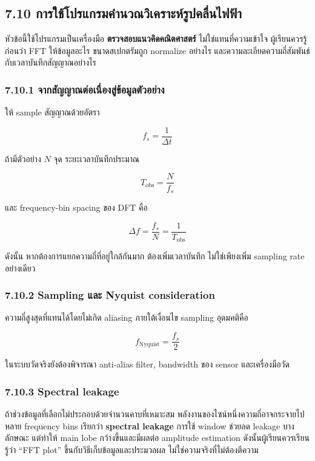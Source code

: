 \subsection{7.10 การใช้โปรแกรมคำนวณวิเคราะห์รูปคลื่นไฟฟ้า}

หัวข้อนี้ใช้โปรแกรมเป็นเครื่องมือ \textbf{ตรวจสอบแนวคิดคณิตศาสตร์} ไม่ใช่แทนที่ความเข้าใจ ผู้เรียนควรรู้ก่อนว่า FFT ให้ข้อมูลอะไร ขนาดสเปกตรัมถูก normalize อย่างไร และความละเอียดความถี่สัมพันธ์กับเวลาบันทึกสัญญาณอย่างไร

\subsubsection{7.10.1 จากสัญญาณต่อเนื่องสู่ข้อมูลตัวอย่าง}

ให้ sample สัญญาณด้วยอัตรา

\[
f_s=\frac{1}{\Delta t}
\]

ถ้ามีตัวอย่าง $N$ จุด ระยะเวลาบันทึกประมาณ

\[
T_{\mathrm{obs}}=\frac{N}{f_s}
\]

และ frequency-bin spacing ของ DFT คือ

\[
\Delta f=\frac{f_s}{N}=\frac{1}{T_{\mathrm{obs}}}
\]

ดังนั้น หากต้องการแยกความถี่ที่อยู่ใกล้กันมาก ต้องเพิ่มเวลาบันทึก ไม่ใช่เพียงเพิ่ม sampling rate อย่างเดียว

\subsubsection{7.10.2 Sampling และ Nyquist consideration}

ความถี่สูงสุดที่แทนได้โดยไม่เกิด aliasing ภายใต้เงื่อนไข sampling อุดมคติคือ

\[
f_{\mathrm{Nyquist}}=\frac{f_s}{2}
\]

ในระบบวัดจริงยังต้องพิจารณา anti-alias filter, bandwidth ของ sensor และเครื่องมือวัด

\subsubsection{7.10.3 Spectral leakage}

ถ้าช่วงข้อมูลที่เลือกไม่ประกอบด้วยจำนวนคาบที่เหมาะสม พลังงานของไซน์หนึ่งความถี่อาจกระจายไปหลาย frequency bins เรียกว่า \textbf{spectral leakage} การใช้ window ช่วยลด leakage บางลักษณะ แต่ทำให้ main lobe กว้างขึ้นและมีผลต่อ amplitude estimation ดังนั้นผู้เรียนควรเรียนรู้ว่า “FFT plot” ขึ้นกับวิธีเก็บข้อมูลและประมวลผล ไม่ใช่ความจริงที่ไม่ต้องตีความ

